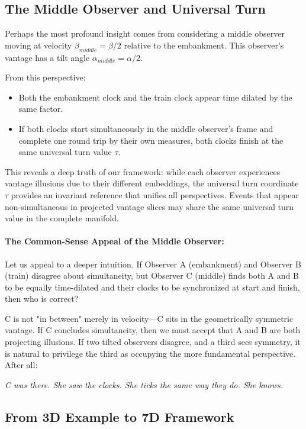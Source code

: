 \documentclass{article}
\begin{document}
\subsection{The Middle Observer and Universal Turn}

Perhaps the most profound insight comes from considering a middle observer moving at velocity $\beta_{middle} = \beta/2$ relative to the embankment. This observer's vantage has a tilt angle $\alpha_{middle} = \alpha/2$.

From this perspective:
\begin{itemize}
\item Both the embankment clock and the train clock appear time dilated by the same factor.
\item If both clocks start simultaneously in the middle observer's frame and complete one round trip by their own measures, both clocks finish at the same universal turn value $\tau$.
\end{itemize}

This reveals a deep truth of our framework: while each observer experiences vantage illusions due to their different embeddings, the universal turn coordinate $\tau$ provides an invariant reference that unifies all perspectives. Events that appear non-simultaneous in projected vantage slices may share the same universal turn value in the complete manifold.

\paragraph{The Common-Sense Appeal of the Middle Observer:} Let us appeal to a deeper intuition. If Observer A (embankment) and Observer B (train) disagree about simultaneity, but Observer C (middle) finds both A and B to be equally time-dilated and their clocks to be synchronized at start and finish, then who is correct?

C is not "in between" merely in velocity---C sits in the geometrically symmetric vantage. If C concludes simultaneity, then we must accept that A and B are both projecting illusions. If two tilted observers disagree, and a third sees symmetry, it is natural to privilege the third as occupying the more fundamental perspective. After all: 

\textit{C was there. She saw the clocks. She ticks the same way they do. She knows.}

\subsection{From 3D Example to 7D Framework}
\end{document}
